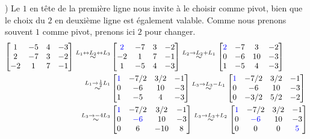 \documentclass{article}
\begin{document}
) Le $1$ en tête de la première ligne nous invite à le choisir comme pivot, bien que le choix du $2$ en deuxième ligne est également valable. Comme nous prenons souvent $1$ comme pivot, prenons ici $2$ pour changer.
\begin{align*}
    \begin{bmatrix}
    1 & -5 & 4 & -3\\
    2 & -7 & 3 & -2\\
    -2 & 1 & 7 & -1
    \end{bmatrix}
    \overset{L_1 \leftrightarrow L_2 \leftrightarrow L_3}{\sim}
    &\begin{bmatrix}
    \color{blue}2 & -7 & 3 &  -2 \\
    -2 & 1 & 7 &  -1 \\
    1 & -5 & 4 &  -3
    \end{bmatrix}
    \overset{L_2 \rightarrow L_2 +L_1}{\sim}
    \begin{bmatrix}
    \color{blue}2 & -7 & 3 &  -2 \\
    0 & -6 & 10 &  -3 \\
    1 & -5 & 4 &  -3
    \end{bmatrix}\\
    \overset{L_1 \rightarrow \frac{1}{2}L_1}{\sim}
    &\begin{bmatrix}
   \color{blue} 1 & -7/2 & 3/2 &  -1 \\
    0 & -6 & 10 &  -3 \\
    1 & -5 & 4 &  -3
    \end{bmatrix} 
    \overset{L_3 \rightarrow L_3 - L_1}{\sim}
    \begin{bmatrix}
    \color{blue}1 & -7/2 & 3/2 & -1 \\
    0 & -6 & 10 &  -3 \\
    0 & -3/2 & 5/2 &  -2
    \end{bmatrix}\\
   \overset{L_3 \rightarrow -4L_3}{\sim}
    &\begin{bmatrix}
    \color{blue}1 & -7/2 & 3/2 &  -1 \\
    0 & \color{blue}-6 & 10 &  -3 \\
    0 & 6 & -10 & 8 %
    \end{bmatrix} 
    \overset{L_3 \rightarrow L_3+L_2}{\sim}
    \begin{bmatrix}
    \color{blue}1 & -7/2 & 3/2 & -1 \\
    0 & \color{blue}-6 & 10 & -3 \\
    0 & 0 & 0 & \color{blue}5
    \end{bmatrix}
\end{align*}
\end{document}

